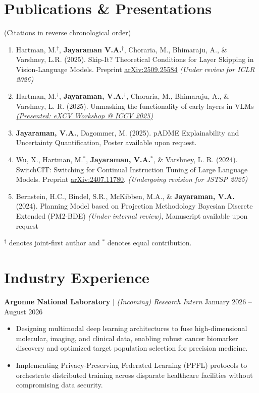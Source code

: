 \documentclass[letterpaper,10pt]{article}
\begin{document}
\section{Publications \& Presentations}
{(Citations in reverse chronological order)}
    \begin{enumerate}[leftmargin=0.25in, itemsep=-2pt]
        \item \label{skip-it} Hartman, M.$^\dagger$, \textbf{Jayaraman V.A.}$^\dagger$, Choraria, M., Bhimaraju, A., \& Varshney, L.R. (2025). Skip-It? Theoretical Conditions for Layer Skipping in Vision-Language Models. Preprint \href{https://www.arxiv.org/abs/2509.25584}{\underline{arXiv:2509.25584}} \textit{(Under review for ICLR 2026)}
        \item \label{unmask} Hartman, M.$^\dagger$, \textbf{Jayaraman, V.A.}$^\dagger$, Choraria, M., Bhimaraju, A., \& Varshney, L. R. (2025). Unmasking the functionality of early layers in VLMs \textit{ \underline{\href{https://excv-workshop.github.io/publication/unmasking-the-functionality-of-early-layers-in-vlms/}{(Presented: eXCV Workshop @ ICCV 2025)}}}
        \item\label{abbvie}\textbf{Jayaraman, V.A.}, Dagommer, M. (2025). pADME Explainability and Uncertainty Quantification, Poster available upon request.
        \item \label{switch-cit} Wu, X., Hartman, M.$^*$, \textbf{Jayaraman, V.A.}$^*$, \& Varshney, L. R. (2024). SwitchCIT: Switching for Continual Instruction Tuning of Large Language Models. Preprint \href{https://arxiv.org/abs/2407.11780}{\underline{arXiv:2407.11780}}. \textit{(Undergoing revision for JSTSP 2025)}
        \item \label{apl} Bernstein, H.C., Bindel, S.R., McKibben, M.A., \& \textbf{Jayaraman, V.A.} (2024). Planning Model based on Projection Methodology Bayesian Discrete Extended (PM2-BDE) \textit{(Under internal review)}, Manuscript available upon request
    \end{enumerate}
    $^\dagger$ denotes joint-first author and $^*$ denotes equal contribution.

\section{Industry Experience}
\textbf{Argonne National Laboratory} $|$ \textit{(Incoming) Research Intern} \hfill January 2026 -- August 2026\vspace{-5pt}
\begin{itemize}[itemsep=-5pt, parsep=5pt, leftmargin=0.25in] 
\item Designing multimodal deep learning architectures to fuse high-dimensional molecular, imaging, and clinical data, enabling robust cancer biomarker discovery and optimized target population selection for precision medicine. 
\item Implementing Privacy-Preserving Federated Learning (PPFL) protocols to orchestrate distributed training across disparate healthcare facilities without compromising data security. 
\end{itemize}
\end{document}
